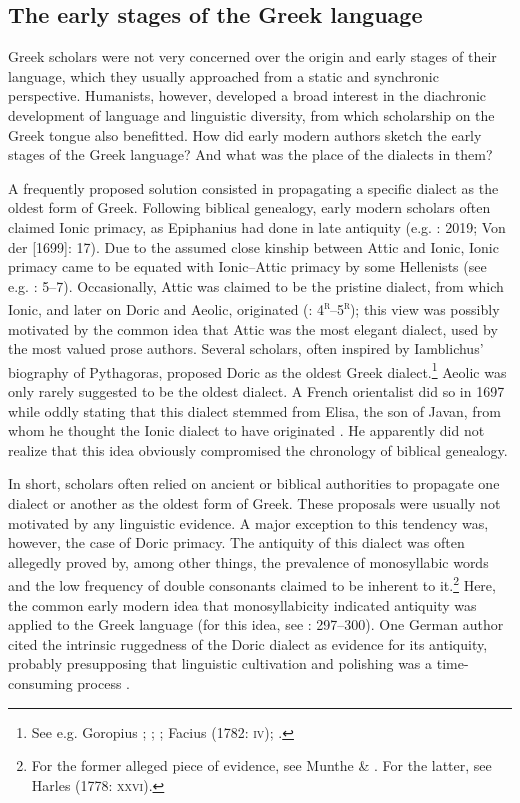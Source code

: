 \documentclass[output=paper]{langsci/langscibook}
\begin{document}
\subsection{The early stages of the Greek language}
\hypertarget{Toc19704838}{}
Greek scholars were not very concerned over the origin and early stages of their language, which they usually approached from a static and synchronic perspective. Humanists, however, developed a broad interest in the diachronic development of language and linguistic diversity, from which scholarship on the Greek tongue also benefitted. How did early modern authors sketch the early stages of the Greek language? And what was the place of the dialects in them?

A frequently proposed solution consisted in propagating a specific dialect as the oldest form of Greek. Following biblical genealogy, early modern scholars often claimed Ionic primacy, as Epiphanius had done in late antiquity (e.g. \citealt{Alsted1630}: 2019; Von der \citealt{Hardt1705} [1699]: 17). Due to the assumed close kinship between Attic and Ionic, Ionic primacy came to be equated with Ionic–Attic primacy by some Hellenists (see e.g. \citealt{Schmidt1604}: 5–7). Occasionally, Attic was claimed to be the pristine dialect, from which Ionic, and later on Doric and Aeolic, originated (\citealt{Baile1588}: 4\textsc{\textsuperscript{r}}–5\textsc{\textsuperscript{r}}); this view was possibly motivated by the common idea that Attic was the most elegant dialect, used by the most valued prose authors. Several scholars, often inspired by Iamblichus’ biography of Pythagoras, proposed Doric as the oldest Greek dialect.\footnote{See e.g. Goropius \citet[860]{Becanus1569}; \citet[29]{Burton1657}; \citet[118]{Mazzocchi1754}; Facius (1782: \textsc{iv}); \citet[21]{Gedike1782}.} Aeolic was only rarely suggested to be the oldest dialect. A French orientalist did so in 1697 while oddly stating that this dialect stemmed from Elisa, the son of Javan, from whom he thought the Ionic dialect to have originated \citep[110]{Thomassin1697}. He apparently did not realize that this idea obviously compromised the chronology of biblical genealogy.

In short, scholars often relied on ancient or biblical authorities to propagate one dialect or another as the oldest form of Greek. These proposals were usually not motivated by any linguistic evidence. A major exception to this tendency was, however, the case of Doric primacy. The antiquity of this dialect was often allegedly proved by, among other things, the prevalence of monosyllabic words and the low frequency of double consonants claimed to be inherent to it.\footnote{For the former alleged piece of evidence, see Munthe \& \citet[17]{Heiberg1748}. For the latter, see Harles (1778: \textsc{xxvi).}} Here, the common early modern idea that monosyllabicity indicated antiquity was applied to the Greek language (for this idea, see \citealt{Jansen1995}: 297–300). One German author cited the intrinsic ruggedness of the Doric dialect as evidence for its antiquity, probably presupposing that linguistic cultivation and polishing was a time-consuming process \citep[21]{Gedike1782}.
\end{document}
